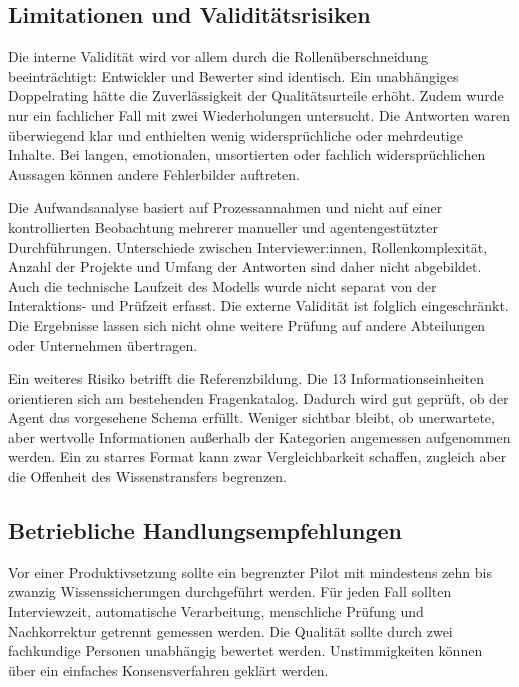 \documentclass[
  10pt,
  ngerman,
  a4paper,
  toc=graduated,
  numbers=noenddot,
  headings=standardclasses,
  nonumberlist
]{scrartcl}
\begin{document}
\subsection{Limitationen und Validitätsrisiken}

Die interne Validität wird vor allem durch die Rollenüberschneidung beeinträchtigt: Entwickler und Bewerter sind identisch. Ein unabhängiges Doppelrating hätte die Zuverlässigkeit der Qualitätsurteile erhöht. Zudem wurde nur ein fachlicher Fall mit zwei Wiederholungen untersucht. Die Antworten waren überwiegend klar und enthielten wenig widersprüchliche oder mehrdeutige Inhalte. Bei langen, emotionalen, unsortierten oder fachlich widersprüchlichen Aussagen können andere Fehlerbilder auftreten.

Die Aufwandsanalyse basiert auf Prozessannahmen und nicht auf einer kontrollierten Beobachtung mehrerer manueller und agentengestützter Durchführungen. Unterschiede zwischen Interviewer:innen, Rollenkomplexität, Anzahl der Projekte und Umfang der Antworten sind daher nicht abgebildet. Auch die technische Laufzeit des Modells wurde nicht separat von der Interaktions- und Prüfzeit erfasst. Die externe Validität ist folglich eingeschränkt. Die Ergebnisse lassen sich nicht ohne weitere Prüfung auf andere Abteilungen oder Unternehmen übertragen.

Ein weiteres Risiko betrifft die Referenzbildung. Die 13 Informationseinheiten orientieren sich am bestehenden Fragenkatalog. Dadurch wird gut geprüft, ob der Agent das vorgesehene Schema erfüllt. Weniger sichtbar bleibt, ob unerwartete, aber wertvolle Informationen außerhalb der Kategorien angemessen aufgenommen werden. Ein zu starres Format kann zwar Vergleichbarkeit schaffen, zugleich aber die Offenheit des Wissenstransfers begrenzen.

\subsection{Betriebliche Handlungsempfehlungen}

Vor einer Produktivsetzung sollte ein begrenzter Pilot mit mindestens zehn bis zwanzig Wissenssicherungen durchgeführt werden. Für jeden Fall sollten Interviewzeit, automatische Verarbeitung, menschliche Prüfung und Nachkorrektur getrennt gemessen werden. Die Qualität sollte durch zwei fachkundige Personen unabhängig bewertet werden. Unstimmigkeiten können über ein einfaches Konsensverfahren geklärt werden.
\end{document}
